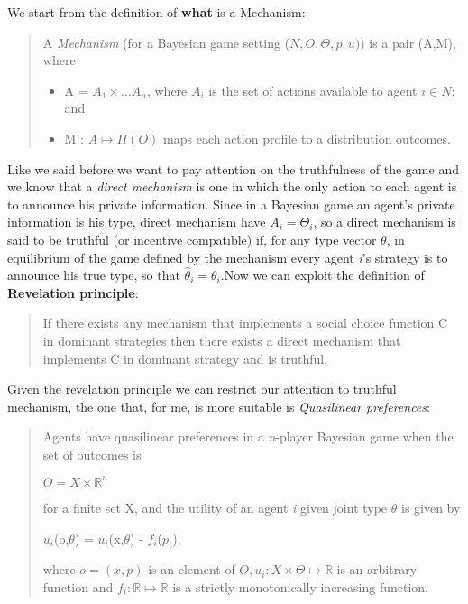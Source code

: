 \documentclass{article}
\begin{document}
\large{
We start from the definition of \textbf{what} is a Mechanism:
\begin{quote}
    A \textit{Mechanism} (for a Bayesian game setting ($N,O,\Theta,p,u)$) is a pair (A,M), where
    \begin{itemize}
        \item A = $A_1 \times \dots A_n$, where $A_i$ is the set of actions available to agent $i \in N$; and
        \item M : $A \mapsto \Pi(O)$ maps each action profile to a distribution outcomes.
    \end{itemize}
\end{quote}
Like we said before we want to pay attention on the truthfulness of the game and we know that a \textit{direct mechanism} is one in which the only action to each agent is to announce his private information. Since in a Bayesian game an agent's private information is his type, direct mechanism have $A_i = \Theta_i$, so a direct mechanism is said to be truthful (or incentive compatible) if, for any type vector $\theta$, in equilibrium of the game defined by the mechanism every agent \textit{i}'s strategy is to announce his true type, so that $\hat{\theta}_i = \theta_i$.\newpage Now we can exploit the definition of \textbf{Revelation principle}:
\begin{quote}
    If there exists any mechanism that implements a social choice function C in dominant strategies then there exists a direct mechanism that implements C in dominant strategy and is truthful.
\end{quote}
Given the revelation principle we can restrict our attention to truthful mechanism, the one that, for me, is more suitable is \textit{Quasilinear preferences}:
\begin{quote}
    Agents have quasilinear preferences in a \textit{n}-player Bayesian game when the set of outcomes is
    \begin{center}
        $O = X \times \mathbb{R}^n$
    \end{center}
    for a finite set X, and the utility of an agent \textit{i} given joint type $\theta$ is given by
    \begin{center}
        $u_i$(o,$\theta$) = $u_i$(x,$\theta$) - $f_i$($p_i$),
    \end{center}
    where $o = (x,p)$ is an element of $O, u_i : X \times \Theta \mapsto \mathbb{R}$ is an arbitrary function  and $f_i : \mathbb{R} \mapsto \mathbb{R}$ is a strictly monotonically increasing function.
\end{quote}
}
\end{document}
